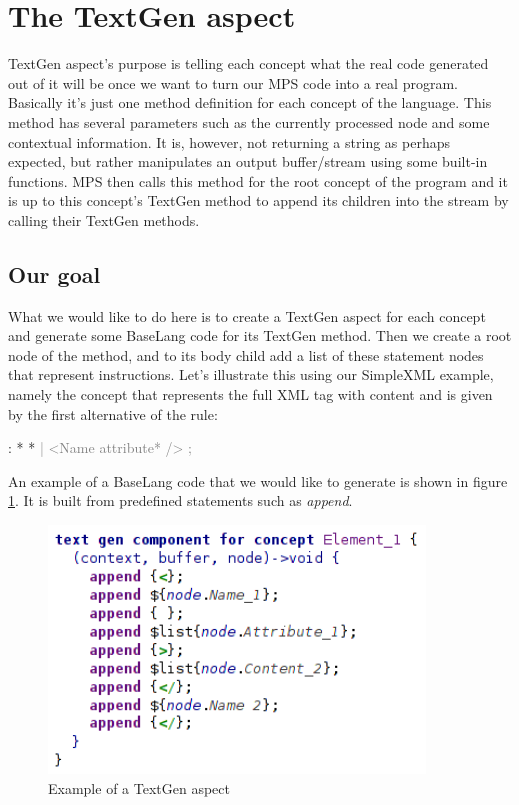 \section{The TextGen aspect}
\label{chap:textgen}

TextGen aspect's purpose is telling each concept what the real code generated out of it will be once we want to turn our MPS code into a real program. Basically it's just one method definition for each concept of the language. This method has several parameters such as the currently processed node and some contextual information. It is, however, not returning a string as perhaps expected, but rather manipulates an output buffer/stream using some built-in functions. MPS then calls this method for the root concept of the program and it is up to this concept's TextGen method to append its children into the stream by calling their TextGen methods.

\subsection{Our goal}

What we would like to do here is to create a TextGen aspect for each concept and generate some BaseLang code for its TextGen method. Then we create a root node of the method, and to its body child add a list of these statement nodes that represent instructions. Let's illustrate this using our SimpleXML example, namely the  concept that represents the full XML tag with content and is given by the first alternative of the  rule:

\begin{antlr}
	   :   \literal{<}  * \literal{>} * \literal{</}  \literal{>}
          \textcolor{gray}{|   \ap<\ap Name attribute* \ap/>\ap}
          \textcolor{gray}{;}
\end{antlr}

An example of a BaseLang code that we would like to generate is shown in figure \ref{fig:textgen_example}. It is built from predefined statements such as \textit{append}.

\begin{figure}[h]
	\centering
	\includegraphics[width=100mm]{../img/textgen_example.png}
	\caption{Example of a TextGen aspect}
	\label{fig:textgen_example}
\end{figure}

